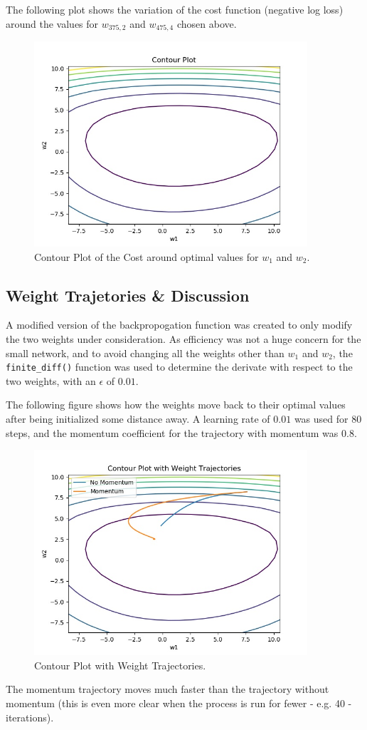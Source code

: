\documentclass{article}
\begin{document}
   The following plot shows the variation of the cost function (negative log loss) around the
   values for $w_{375,2}$ and $w_{475,4}$ chosen above.

      \begin{figure}[H] \centering
         \includegraphics[width=4in]{resources/part6a}
         \caption{Contour Plot of the Cost around optimal values for $w_1$ and $w_2$.}
      \end{figure}

   \subsection{Weight Trajetories \& Discussion}
   A modified version of the backpropogation function was created to only modify the two
   weights under consideration. As efficiency was not a huge concern for the small network,
   and to avoid changing all the weights other than $w_1$ and $w_2$, the \texttt{finite\_diff()}
   function was used to determine the derivate with respect to the two weights, with an
   $\epsilon$ of $0.01$.

   The following figure shows how the weights move back to their optimal values after being
   initialized some distance away. A learning rate of $0.01$ was used for 80 steps, and
   the momentum coefficient for the trajectory with momentum was $0.8$.
      \begin{figure}[H] \centering
         \includegraphics[width=4in]{resources/part6bc}
         \caption{Contour Plot with Weight Trajectories.}
      \end{figure}
   The momentum trajectory moves much faster than the trajectory without momentum (this is even more
   clear when the process is run for fewer - e.g. 40 - iterations).
\end{document}

